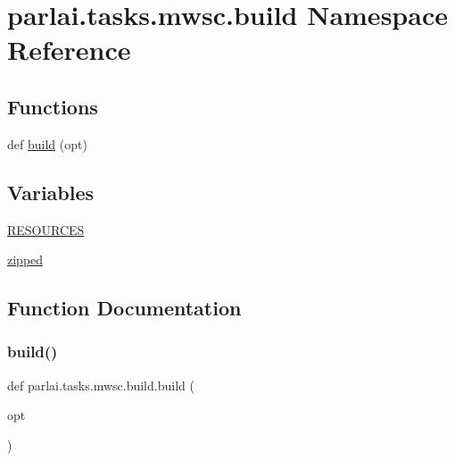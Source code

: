 \hypertarget{namespaceparlai_1_1tasks_1_1mwsc_1_1build}{}\section{parlai.\+tasks.\+mwsc.\+build Namespace Reference}
\label{namespaceparlai_1_1tasks_1_1mwsc_1_1build}
\subsection*{Functions}
\begin{DoxyCompactItemize}
\item 
def \hyperlink{namespaceparlai_1_1tasks_1_1mwsc_1_1build_a21fb0afba67df57037a48b4250337077}{build} (opt)
\end{DoxyCompactItemize}
\subsection*{Variables}
\begin{DoxyCompactItemize}
\item 
\hyperlink{namespaceparlai_1_1tasks_1_1mwsc_1_1build_a7b7842b18b674a1b523b16617f65908a}{R\+E\+S\+O\+U\+R\+C\+ES}
\item 
\hyperlink{namespaceparlai_1_1tasks_1_1mwsc_1_1build_a3739cb2c63f7061eac5167f7d0f7c290}{zipped}
\end{DoxyCompactItemize}


\subsection{Function Documentation}
\mbox{\label{namespaceparlai_1_1tasks_1_1mwsc_1_1build_a21fb0afba67df57037a48b4250337077}} 
\subsubsection{\texorpdfstring{build()}{build()}}
{\footnotesize\ttfamily def parlai.\+tasks.\+mwsc.\+build.\+build (\begin{DoxyParamCaption}\item[{}]{opt }\end{DoxyParamCaption})}



